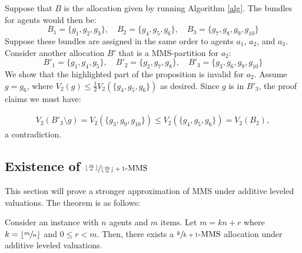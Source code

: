 \documentclass{article}
\theoremstyle{definition}
\begin{document}
Suppose that $B$ is the allocation given by running Algorithm \ref{alg}. The bundles for agents would then be:
\[
B_1 = \{g_1, g_2, g_3\}, \quad B_2 = \{g_4, g_5, g_6\}, \quad B_3 = \{g_7, g_8, g_9, g_{10}\}
\]
Suppose these bundles are assigned in the same order to agents $a_1$, $a_2$, and $a_3$. Consider another allocation $B'$ that is a MMS-partition for $a_2$:
\[
B'_1 = \{g_1, g_4, g_5\}, \quad B'_2 = \{g_2, g_7, g_8\}, \quad B'_3 = \{g_3, g_6, g_9, g_{10}\}
\]
We show that the highlighted part of the proposition is invalid for $a_2$. Assume $g = g_6$, where $V_2(g) \leq \frac{1}{2}V_2(\{g_4,g_5, g_6\})$ as desired. Since $g$ is in $B'_3$, the proof claims we must have:


\begin{align*} 
 V_2(B'_3 \setminus g) = V_2(\{g_3, g_9, g_{10}\}) \leq V_2(\{g_4, g_5, g_6\}) = V_2(B_2),
\end{align*}
a contradiction.

\subsection{Existence of $\sfrac{\lfloor\frac{m}{n}\rfloor}{\lfloor\frac{m}{n}\rfloor + 1}\text{-MMS}$ }
    
This section will prove a stronger approximation of MMS under additive leveled valuations. The theorem is as follows: 

 \begin{theorem}
     Consider an instance with $n$ agents and $m$ items. Let $m = kn + r$ where $k = \lfloor \sfrac{m}{n} \rfloor$ and $0 \le r < m$. Then, there exists a $\sfrac{k}{k + 1}\text{-MMS}$ allocation under additive leveled valuations.
 \end{theorem}
\end{document}
